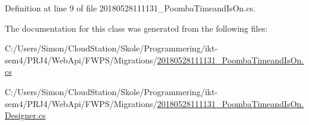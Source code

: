 Definition at line 9 of file 20180528111131\+\_\+\+Poomba\+Timeand\+Is\+On.\+cs.



The documentation for this class was generated from the following files\+:\begin{DoxyCompactItemize}
\item 
C\+:/\+Users/\+Simon/\+Cloud\+Station/\+Skole/\+Programmering/ikt-\/sem4/\+P\+R\+J4/\+Web\+Api/\+F\+W\+P\+S/\+Migrations/\mbox{\hyperlink{20180528111131___poomba_timeand_is_on_8cs}{20180528111131\+\_\+\+Poomba\+Timeand\+Is\+On.\+cs}}\item 
C\+:/\+Users/\+Simon/\+Cloud\+Station/\+Skole/\+Programmering/ikt-\/sem4/\+P\+R\+J4/\+Web\+Api/\+F\+W\+P\+S/\+Migrations/\mbox{\hyperlink{20180528111131___poomba_timeand_is_on_8_designer_8cs}{20180528111131\+\_\+\+Poomba\+Timeand\+Is\+On.\+Designer.\+cs}}\end{DoxyCompactItemize}
